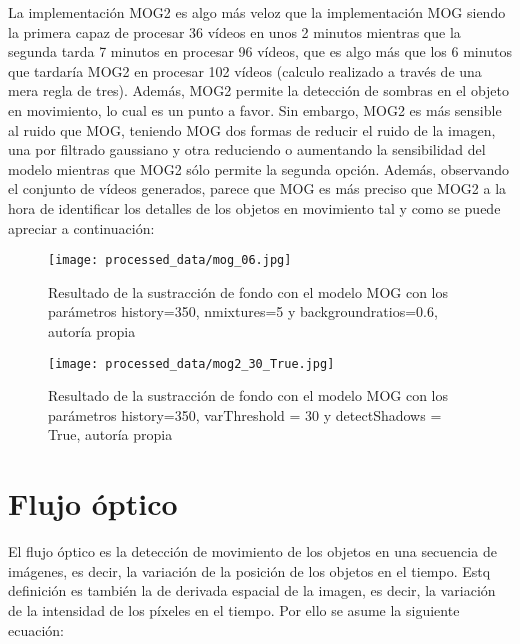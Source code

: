 \documentclass[a4paper,12pt]{article}
\begin{document}
{\vspace{0.5cm}

La implementación MOG2 es algo más veloz que la implementación MOG siendo la primera capaz de procesar 36 vídeos en unos 2 minutos mientras que la segunda tarda 7 minutos en procesar 96 vídeos, que es algo más
que los 6 minutos que tardaría MOG2 en procesar 102 vídeos (calculo realizado a través de una mera regla de tres). Además, MOG2 permite la detección de sombras en el objeto en movimiento, lo cual es un punto a favor.
Sin embargo, MOG2 es más sensible al ruido que MOG, teniendo MOG dos formas de reducir el ruido de la imagen, una por filtrado gaussiano y otra reduciendo o aumentando la sensibilidad del modelo mientras que MOG2
sólo permite la segunda opción. Además, observando el conjunto de vídeos generados, parece que MOG es más preciso que MOG2 a la hora de identificar los detalles de los objetos en movimiento tal y como se puede apreciar
a continuación:

\newpage

\begin{figure}[h!]
    \centering
    \begin{minipage}[t]{0.45\textwidth}
        \centering
        \texttt{[image: processed\_data/mog\_06.jpg]}
        \caption{Resultado de la sustracción de fondo con el modelo MOG con los parámetros history=350, nmixtures=5 y backgroundratios=0.6, autoría propia}
        \label{fig:mog}
    \end{minipage}
    \hfill
    \begin{minipage}[t]{0.45\textwidth}
        \centering
        \texttt{[image: processed\_data/mog2\_30\_True.jpg]}
        \caption{Resultado de la sustracción de fondo con el modelo MOG con los parámetros history=350, varThreshold = 30 y detectShadows = True, autoría propia}
        \label{fig:mog2}
    \end{minipage}

\end{figure}

\newpage


\section{Flujo óptico}


\vspace{1cm}

El flujo óptico es la detección de movimiento de los objetos en una secuencia de imágenes, es decir, la variación de la posición de los objetos en el tiempo. Estq definición
es también la de derivada espacial de la imagen, es decir, la variación de la intensidad de los píxeles en el tiempo. Por ello se asume la siguiente ecuación:

}
\end{document}
